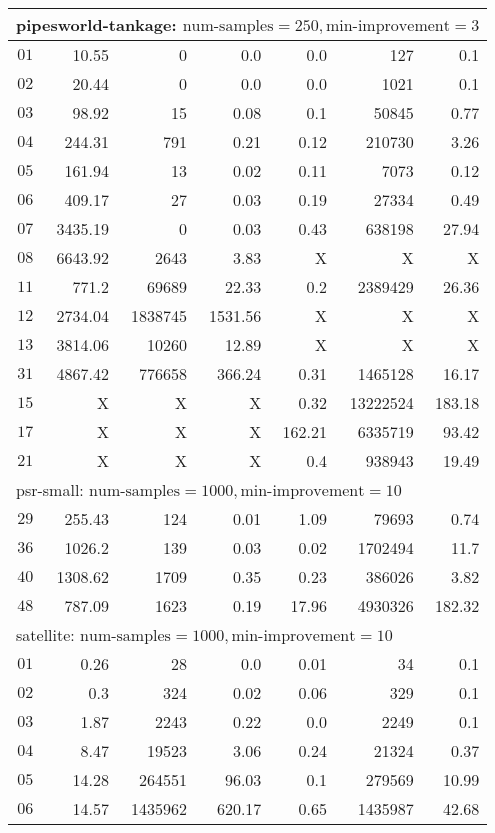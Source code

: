 \begin{longtable}{|c||r|r|r||r|r|r|}
\multicolumn{7}{|l|}{pipesworld-tankage: $\text{num-samples}=250,\text{min-improvement}=3$}\\\hline
$01$ & 10.55 & 0 & 0.0 & 0.0 & 127 & 0.1 \\\hline
$02$ & 20.44 & 0 & 0.0 & 0.0 & 1021 & 0.1 \\\hline
$03$ & 98.92 & 15 & 0.08 & 0.1 & 50845 & 0.77 \\\hline
$04$ & 244.31 & 791 & 0.21 & 0.12 & 210730 & 3.26 \\\hline
$05$ & 161.94 & 13 & 0.02 & 0.11 & 7073 & 0.12 \\\hline
$06$ & 409.17 & 27 & 0.03 & 0.19 & 27334 & 0.49 \\\hline
$07$ & 3435.19 & 0 & 0.03 & 0.43 & 638198 & 27.94 \\\hline
$08$ & 6643.92 & 2643 & 3.83 & X & X & X \\\hline
$11$ & 771.2 & 69689 & 22.33 & 0.2 & 2389429 & 26.36 \\\hline
$12$ & 2734.04 & 1838745 & 1531.56 & X & X & X \\\hline
$13$ & 3814.06 & 10260 & 12.89 & X & X & X \\\hline
$31$ & 4867.42 & 776658 & 366.24 & 0.31 & 1465128 & 16.17 \\\hline
$15$ &  X &  X &  X & 0.32 & 13222524 & 183.18 \\\hline
$17$ &  X &  X &  X & 162.21 & 6335719 & 93.42 \\\hline
$21$ &  X &  X &  X & 0.4 & 938943 & 19.49 \\\hline


\multicolumn{7}{|l|}{psr-small: $\text{num-samples}=1000,\text{min-improvement}=10$}\\\hline
$29$ & 255.43 & 124 & 0.01 & 1.09 & 79693 & 0.74 \\\hline
$36$ & 1026.2 & 139 & 0.03 & 0.02 & 1702494 & 11.7 \\\hline
$40$ & 1308.62 & 1709 & 0.35 & 0.23 & 386026 & 3.82 \\\hline
$48$ & 787.09 & 1623 & 0.19 & 17.96 & 4930326 & 182.32 \\\hline


\multicolumn{7}{|l|}{satellite: $\text{num-samples}=1000,\text{min-improvement}=10$}\\\hline
$01$ & 0.26 & 28 & 0.0 & 0.01 & 34 & 0.1 \\\hline
$02$ & 0.3 & 324 & 0.02 & 0.06 & 329 & 0.1 \\\hline
$03$ & 1.87 & 2243 & 0.22 & 0.0 & 2249 & 0.1 \\\hline
$04$ & 8.47 & 19523 & 3.06 & 0.24 & 21324 & 0.37 \\\hline
$05$ & 14.28 & 264551 & 96.03 & 0.1 & 279569 & 10.99 \\\hline
$06$ & 14.57 & 1435962 & 620.17 & 0.65 & 1435987 & 42.68 \\\hline


\end{longtable}
